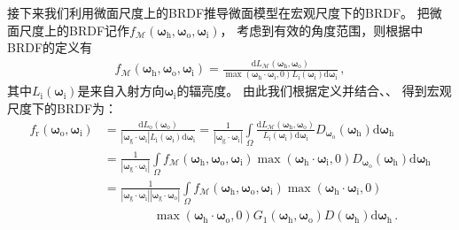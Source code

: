 接下来我们利用微面尺度上的BRDF推导微面模型在宏观尺度下的BRDF。
把微面尺度上的BRDF记作$f_{\mathcal{M}}({\bm\omega}_{\mathrm{h}},{\bm\omega}_{\mathrm{o}},{\bm\omega}_{\mathrm{i}})$，
考虑到有效的角度范围，则根据中BRDF的定义有
\begin{align}\label{eq:08ex01-MicrosurfaceBRDF}
    f_{\mathcal{M}}({\bm\omega}_{\mathrm{h}},{\bm\omega}_{\mathrm{o}},{\bm\omega}_{\mathrm{i}})
    =\frac{\mathrm{d} L_{\mathcal{M}}({\bm\omega}_{\mathrm{h}},{\bm\omega}_{\mathrm{o}})}
    {\max({\bm\omega}_{\mathrm{h}}\cdot{\bm\omega}_{\mathrm{i}},0)
    L_{\mathrm{i}}({\bm\omega}_{\mathrm{i}})\mathrm{d}{\bm\omega}_{\mathrm{i}}}\, ,
\end{align}
其中$L_{\mathrm{i}}({\bm\omega}_{\mathrm{i}})$是来自入射方向${\bm\omega}_{\mathrm{i}}$的辐亮度。
由此我们根据定义并结合、、
得到宏观尺度下的BRDF为：
\begin{align}\label{eq:08ex01-MacroBRDFG1}
    f_{\mathrm{r}}({\bm\omega}_{\mathrm{o}},{\bm\omega}_{\mathrm{i}})
     & = \frac{\mathrm{d} L_{\mathrm{o}}({\bm\omega}_{\mathrm{o}})}
    {|{\bm\omega}_{\mathrm{g}}\cdot{\bm\omega}_{\mathrm{i}}|
    L_{\mathrm{i}}({\bm\omega}_{\mathrm{i}})\mathrm{d}{\bm\omega}_{\mathrm{i}}}
    = \frac{1}{|{\bm\omega}_{\mathrm{g}}\cdot{\bm\omega}_{\mathrm{i}}|}
    \int\limits_{\varOmega}\frac{\mathrm{d}L_{\mathcal{M}}({\bm\omega}_{\mathrm{h}},{\bm\omega}_{\mathrm{o}})}
    {L_{\mathrm{i}}({\bm\omega}_{\mathrm{i}})\mathrm{d}{\bm\omega}_{\mathrm{i}}}
    D_{{\bm\omega}_{\mathrm{o}}}({\bm\omega}_{\mathrm{h}})\mathrm{d}{\bm\omega}_{\mathrm{h}}\nonumber \\
     & = \frac{1}{|{\bm\omega}_{\mathrm{g}}\cdot{\bm\omega}_{\mathrm{i}}|}
    \int\limits_{\varOmega}f_{\mathcal{M}}({\bm\omega}_{\mathrm{h}},{\bm\omega}_{\mathrm{o}},{\bm\omega}_{\mathrm{i}})
    \max({\bm\omega}_{\mathrm{h}}\cdot{\bm\omega}_{\mathrm{i}},0)
    D_{{\bm\omega}_{\mathrm{o}}}({\bm\omega}_{\mathrm{h}})\mathrm{d}{\bm\omega}_{\mathrm{h}}\nonumber \\
     & = \frac{1}{|{\bm\omega}_{\mathrm{g}}\cdot{\bm\omega}_{\mathrm{i}}|
    |{\bm\omega}_{\mathrm{g}}\cdot{\bm\omega}_{\mathrm{o}}|}
    \int\limits_{\varOmega}f_{\mathcal{M}}({\bm\omega}_{\mathrm{h}},{\bm\omega}_{\mathrm{o}},{\bm\omega}_{\mathrm{i}})
    \max({\bm\omega}_{\mathrm{h}}\cdot{\bm\omega}_{\mathrm{i}},0)\nonumber                            \\
     & \qquad\qquad\max({\bm\omega}_{\mathrm{h}}\cdot{\bm\omega}_{\mathrm{o}},0)
    G_1({\bm\omega}_{\mathrm{h}},{\bm\omega}_{\mathrm{o}})
    D({\bm\omega}_{\mathrm{h}})\mathrm{d}{\bm\omega}_{\mathrm{h}}\, .
\end{align}


